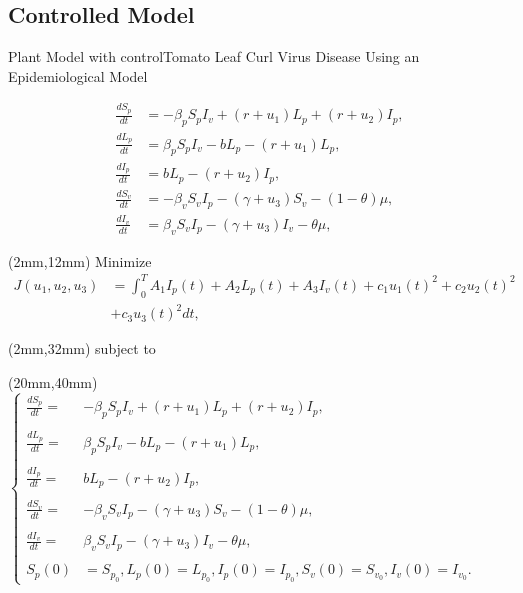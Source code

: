 \documentclass[10pt]{beamer}
\begin{document}
\subsection{Controlled Model}
\begin{frame}{Plant Model with control}{Tomato Leaf Curl Virus Disease Using an Epidemiological Model}

        \begin{align*}
            \frac{dS_p}{dt} &=-\beta_p S_p I_v +(r +u_1)L_p + (r + u_2) I_p,\\
            \frac{dL_p}{dt} &=\beta_p S_p I_v -b L_p -(r + u_1)L_p,\\
            \frac{dI_p}{dt} &= b L_p - (r + u_2) I_p,\\
            \frac{dS_v}{dt} &=-\beta_v S_v I_p - (\gamma+u_3) S_v -(1-\theta)\mu,\\
            \frac{dI_v}{dt} &=\beta_v S_v I_p -(\gamma+u_3) I_v -\theta\mu,				
        \end{align*}
\end{frame}


\begin{frame}
	\begin{textblock*}{120mm}(2mm,12mm)
		Minimize
		\begin{align*}
			J(u_1,u_2,u_3)&=\int_{0}^T	A_1 I_p(t) + A_2 L_p(t) + A_3 I_v(t)
			+ c_1 u_1(t)^2+ c_2 u_2(t)^2\\ &+ c_3 u_3(t)^2 dt,
		\end{align*}
	\end{textblock*}
	\begin{textblock*}{20mm}(2mm,32mm)
		subject to
	\end{textblock*}

	\begin{textblock*}{120mm}(20mm,40mm)
		\hspace{50mm}	$\left\{ \begin{array}{ll}
				\frac{dS_p}{dt} = &-\beta_p S_p I_v +(r +u_1)L_p + (r + u_2) I_p,\\\\
				\frac{dL_p}{dt} =&\beta_p S_p I_v -b L_p -(r + u_1)L_p,\\\\
				\frac{dI_p}{dt} =& b L_p - (r + u_2) I_p,\\\\
				\frac{dS_v}{dt} =&-\beta_v S_v I_p - (\gamma+u_3) S_v -(1-\theta)\mu,\\\\
				\frac{dI_v}{dt} =&\beta_v S_v I_p -(\gamma+u_3) I_v -\theta\mu,\\\\
				S_p(0) &= S_{p_0}, L_p(0) = L_{p_0},I_p(0) = I_{p_0},S_v(0) = S_{v_0}, I_v(0) = I_{v_0}.			
			\end{array}\right.$
	\end{textblock*}
\end{frame}
\end{document}
